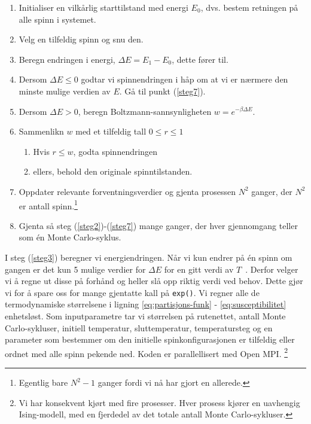 \documentclass[11pt]{article}
\begin{document}
\begin{enumerate}
\item Initialiser en vilkårlig starttilstand med energi $E_0$, dvs. 
bestem retningen på alle spinn i systemet. 
\item Velg en tilfeldig spinn og snu den.\label{steg2}
\item Beregn endringen i energi, $\Delta E = E_1-E_0$, dette fører til.\label{steg3} 
\item Dersom $\Delta E \leq 0$ godtar vi spinnendringen i håp om at vi
  er nærmere den minste mulige verdien av $E$. Gå til punkt (\ref{steg7}).
\item Dersom $\Delta E > 0 $, beregn Boltzmann-sannsynligheten $w = e^{-\beta\Delta E}$. 
\item Sammenlikn $w$ med et tilfeldig tall $0\leq r\leq 1$ \label{steg6}
\begin{enumerate}
  \item Hvis $r\leq w$, godta spinnendringen
  \item ellers, behold den originale spinntilstanden.
\end{enumerate}
\item Oppdater relevante forventningsverdier og gjenta prosessen\label{steg7}
  $N^2$ ganger, der $N^2$ er antall spinn.\footnote{Egentlig bare $N^2-1$ ganger fordi vi nå har gjort en
  allerede.}
\item Gjenta så steg (\ref{steg2})-(\ref{steg7}) mange ganger, der hver gjennomgang teller som
  én Monte Carlo-syklus.
\end{enumerate}

I steg (\ref{steg3}) beregner vi energiendringen. Når vi kun endrer på
én spinn om gangen er det kun 5 mulige verdier for $\Delta E$ for en
gitt verdi av $T$~\cite[s. 436]{Lecture-notes}. Derfor velger vi å
regne ut disse på forhånd og heller slå opp riktig verdi ved
behov. Dette gjør vi for å spare oss for mange gjentatte kall på \texttt{exp()}. Vi regner alle de termodynamiske størrelsene
i ligning \eqref{eq:partisjons-funk} - \eqref{eq:susceptibilitet} enhetsløst. 
 Som inputparametre tar vi størrelsen på rutenettet, antall Monte Carlo-sykluser,
initiell temperatur, sluttemperatur, temperatursteg og en parameter som bestemmer om den initielle
spinkonfigurasjonen er tilfeldig eller ordnet med alle spinn pekende ned. Koden er parallellisert med Open MPI. \footnote{Vi har konsekvent kjørt med fire
prosesser. Hver prosess kjører en uavhengig Ising-modell, med en fjerdedel av det totale antall Monte Carlo-sykluser. }
\end{document}
